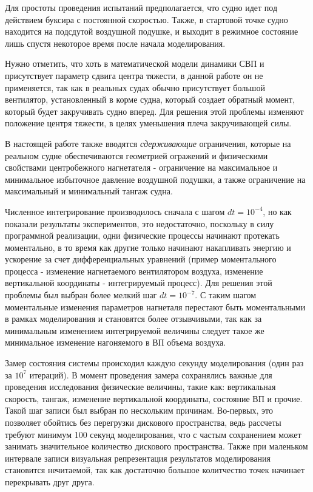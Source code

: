 Для простоты проведения испытаний предполагается, что судно идет под действием буксира с постоянной скоростью. Также, в стартовой точке судно находится на подсдутой воздушной подушке, и выходит в режимное состояние лишь спустя некоторое время после начала моделирования.

Нужно отметить, что хоть в математической модели динамики СВП и присутствует параметр сдвига центра тяжести, в данной работе он не применяется, так как в реальных судах обычно присутствует большой вентилятор, установленный в корме судна, который создает обратный момент, который будет закручивать судно вперед. Для решения этой проблемы изменяют положение центря тяжести, в целях уменьшения плеча закручивающей силы.

В настоящей работе также вводятся {\it сдерживающие} ограничения, которые на реальном судне обеспечиваются геометрией огражений и физическими свойствами центробежного нагнетателя - ограничение на максимальное и минимальное избыточное давление воздушной подушки, а также ограничение на максимальный и минимальный тангаж судна.

Численное интегрирование производилось сначала с шагом $dt = 10^{-4}$, но как показали результаты экспериментов, это недостаточно, поскольку в силу программной реализации, одни физические процессы начинают протекать моментально, в то время как другие только начинают накапливать энергию и ускорение за счет дифференциальных уравнений (пример моментального процесса - изменение нагнетаемого вентилятором воздуха, изменение вертикальной координаты - интегрируемый процесс). Для решения этой проблемы был выбран более мелкий шаг $dt = 10^{-7}$. С таким шагом моментальные изменения параметров нагнеталя перестают быть моментальными в рамках моделирования и становятся более отзывчивыми, так как за минимальным изменением интегрируемой величины следует такое же минимальное изменение нагоняемого в ВП объема воздуха.

Замер состояния системы происходил каждую секунду моделирования (один раз за $10^7$ итераций). В момент проведения замера сохранялись важные для проведения исследования физические величины, такие как: вертикальная скорость, тангаж, изменение вертикальной координаты, состояние ВП и прочие. Такой шаг записи был выбран по нескольким причинам. Во-первых, это позволяет обойтись без перегрузки дискового пространства, ведь рассчеты требуют минимум 100 секунд моделирования, что с частым сохранением может занимать значительное количество дискового пространства. Также при маленьком интервале записи визуальная репрезентация результатов моделирования становится нечитаемой, так как достаточно большое колитчество точек начинает перекрывать друг друга.

